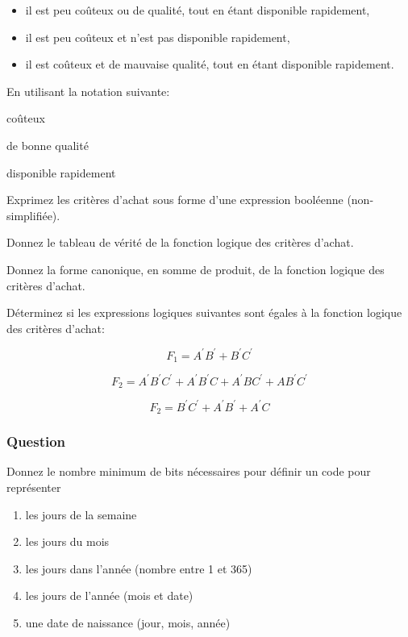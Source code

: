 \documentclass[11pt]{article}
\begin{document}
\begin{itemize}
\item il est peu coûteux ou de qualité, tout en étant disponible
rapidement,

\item il est peu coûteux et n'est pas disponible rapidement,

\item il est coûteux et de mauvaise qualité, tout en étant disponible
rapidement.
\end{itemize}

En utilisant la notation suivante:

\begin{description}
\item[{A}] coûteux

\item[{B}] de bonne qualité

\item[{C}] disponible rapidement

\item Exprimez les critères d'achat sous forme d'une expression
booléenne (non-simplifiée).

\item Donnez le tableau de vérité de la fonction logique des critères
d'achat.

\item Donnez la forme canonique, en somme de produit, de la fonction
logique des critères d'achat.

\item Déterminez si les expressions logiques suivantes sont égales à la
fonction logique des critères d'achat:

$$F_1 = A^{\prime} B^{\prime} + B^{\prime} C^{\prime}$$

$$F_2 = A^{\prime} B^{\prime} C^{\prime} + A^{\prime} B^{\prime} C + A^{\prime} B C^{\prime} + A B^{\prime} C^{\prime}$$

$$F_2 = B^{\prime} C^{\prime} + A^{\prime} B^{\prime} + A^{\prime} C$$
\end{description}

\subsubsection*{Question}
\label{sec:org86d2b38}
Donnez le nombre minimum de bits nécessaires pour définir un code pour représenter

\begin{enumerate}
\item les jours de la semaine

\item les jours du mois

\item les jours dans l'année (nombre entre 1 et 365)

\item les jours de l'année (mois et date)

\item une date de naissance (jour, mois, année)
\end{enumerate}
\end{document}
